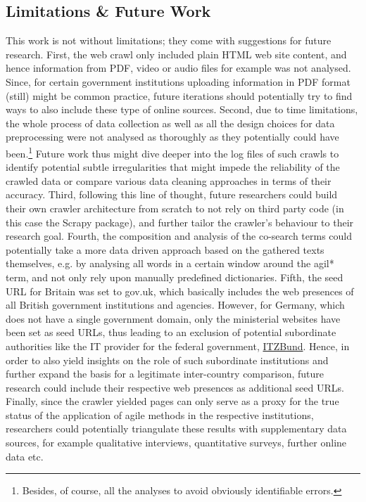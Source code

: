 \subsection{Limitations \& Future Work}\label{Limitations and Future Work}
This work is not without limitations; they come with suggestions for future research. First, the web crawl only included plain HTML web site content, and hence information from PDF, video or audio files for example was not analysed. Since, for certain government institutions uploading information in PDF format (still) might be common practice, future iterations should potentially try to find ways to also include these type of online sources. Second, due to time limitations, the whole process of data collection as well as all the design choices for data preprocessing were not analysed as thoroughly as they potentially could have been.\footnote{Besides, of course, all the analyses to avoid obviously identifiable errors.} Future work thus might dive deeper into the log files of such crawls to identify potential subtle irregularities that might impede the reliability of the crawled data or compare various data cleaning approaches in terms of their accuracy. Third, following this line of thought, future researchers could build their own crawler architecture from scratch to not rely on third party code (in this case the Scrapy package), and further tailor the crawler's behaviour to their research goal. Fourth, the composition and analysis of the co-search terms could potentially take a more data driven approach based on the gathered texts themselves, e.g. by analysing all words in a certain window around the agil* term, and not only rely upon manually predefined dictionaries. Fifth, the seed URL for Britain was set to gov.uk, which basically includes the web presences of all British government institutions and agencies. However, for Germany, which does not have a single government domain, only the ministerial websites have been set as seed URLs, thus leading to an exclusion of potential subordinate authorities like the IT provider for the federal government, \href{https://www.itzbund.de/DE/Home/home_node.html}{ITZBund}. Hence, in order to also yield insights on the role of such subordinate institutions and further expand the basis for a legitimate inter-country comparison, future research could include their respective web presences as additional seed URLs. Finally, since the crawler yielded pages can only serve as a proxy for the true status of the application of agile methods in the respective institutions, researchers could potentially triangulate these results with supplementary data sources, for example qualitative interviews, quantitative surveys, further online data etc. 

